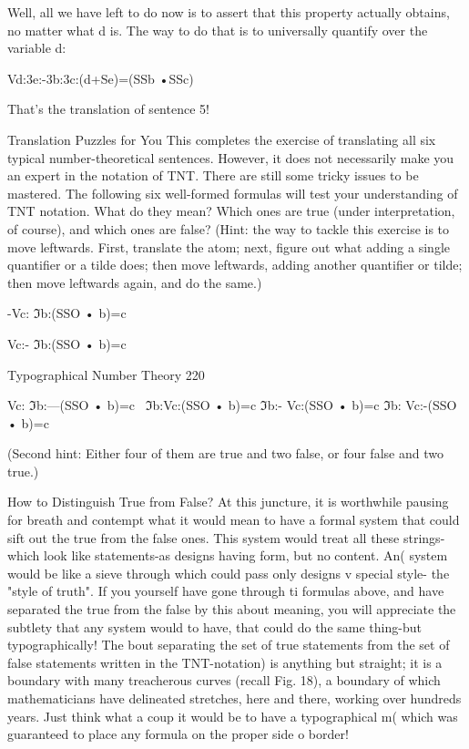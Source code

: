 Well, all we have left to do now is to assert that this property actually obtains, no matter
what d is. The way to do that is to universally quantify over the variable d:

                            Vd:3e:-3b:3c:(d+Se)=(SSb •SSc)

That's the translation of sentence 5!


                            Translation Puzzles for You
This completes the exercise of translating all six typical number-theoretical sentences.
However, it does not necessarily make you an expert in the notation of TNT. There are
still some tricky issues to be mastered. The following six well-formed formulas will test
your understanding of TNT notation. What do they mean? Which ones are true (under
interpretation, of course), and which ones are false? (Hint: the way to tackle this exercise
is to move leftwards. First, translate the atom; next, figure out what adding a single
quantifier or a tilde does; then move leftwards, adding another quantifier or tilde; then
move leftwards again, and do the same.)

                                   -Vc: ℑb:(SSO • b)=c

                                   Vc:- ℑb:(SSO • b)=c



Typographical Number Theory                                                             220

                                   Vc: ℑb:---(SSO • b)=c
                                   ~ℑb:Vc:(SSO • b)=c
                                   ℑb:- Vc:(SSO • b)=c
                                   ℑb: Vc:-(SSO • b)=c

(Second hint: Either four of them are true and two false, or four false and two true.)

                       How to Distinguish True from False?
At this juncture, it is worthwhile pausing for breath and contempt what it would mean to
have a formal system that could sift out the true from the false ones. This system would
treat all these strings-which look like statements-as designs having form, but no content.
An( system would be like a sieve through which could pass only designs v special style-
the "style of truth". If you yourself have gone through ti formulas above, and have
separated the true from the false by this about meaning, you will appreciate the subtlety
that any system would to have, that could do the same thing-but typographically! The
bout separating the set of true statements from the set of false statements written in the
TNT-notation) is anything but straight; it is a boundary with many treacherous curves
(recall Fig. 18), a boundary of which mathematicians have delineated stretches, here and
there, working over hundreds years. Just think what a coup it would be to have a
typographical m( which was guaranteed to place any formula on the proper side o border!

